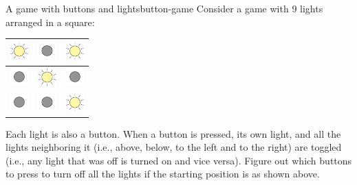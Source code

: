 \begin{example}{A game with buttons and lights}{button-game}
  Consider a game with 9 lights arranged in a square:
  \begin{center}
    \begin{tabular}{|c|c|c|}
      \hline
      \rule{0ex}{8.5mm}\includegraphics[width=7mm]{figures/lighton} &
      \rule{0ex}{8.5mm}\includegraphics[width=7mm]{figures/lightoff} &
      \rule{0ex}{8.5mm}\includegraphics[width=7mm]{figures/lighton} \\\hline
      \rule{0ex}{8.5mm}\includegraphics[width=7mm]{figures/lightoff} &
      \rule{0ex}{8.5mm}\includegraphics[width=7mm]{figures/lighton} &
      \rule{0ex}{8.5mm}\includegraphics[width=7mm]{figures/lightoff} \\\hline
      \rule{0ex}{8.5mm}\includegraphics[width=7mm]{figures/lightoff} &
      \rule{0ex}{8.5mm}\includegraphics[width=7mm]{figures/lightoff} &
      \rule{0ex}{8.5mm}\includegraphics[width=7mm]{figures/lighton} \\\hline
    \end{tabular}
  \end{center}
  Each light is also a button. When a button is pressed, its own
  light, and all the lights neighboring it (i.e., above, below, to the
  left and to the right) are toggled (i.e., any light that was off is
  turned on and vice versa). Figure out which buttons to press to
  turn off all the lights if the starting position is as shown above.
\end{example}


